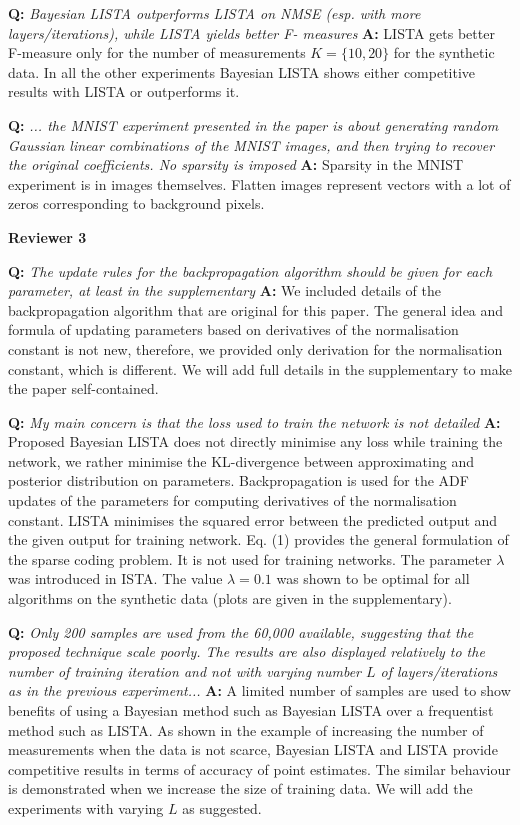 \documentclass{article}
\begin{document}
\textbf{Q:} \textit{Bayesian LISTA outperforms LISTA on NMSE (esp. with more layers/iterations), while LISTA yields better F- measures}
\textbf{A:} LISTA gets better F-measure only for the number of measurements $K = \{10, 20\}$ for the synthetic data. In all the other experiments Bayesian LISTA shows either competitive results with LISTA or outperforms it.

\textbf{Q:} \textit{... the MNIST experiment presented in the paper is about generating random Gaussian linear combinations of the MNIST images, and then trying to recover the original coefficients. No sparsity is imposed}
\textbf{A:} Sparsity in the MNIST experiment is in images themselves. Flatten images represent vectors with a lot of zeros corresponding to background pixels.

\textbf{Reviewer 3}

\textbf{Q:} \textit{The update rules for the backpropagation algorithm should be given for each parameter, at least in the supplementary}
\textbf{A:} We included details of the backpropagation algorithm that are original for this paper. The general idea and formula of updating parameters based on derivatives of the normalisation constant is not new, therefore, we provided only derivation for the normalisation constant, which is different. We will add full details in the supplementary to make the paper self-contained.

\textbf{Q:} \textit{My main concern is that the loss used to train the network is not detailed}
\textbf{A:} Proposed Bayesian LISTA does not directly minimise any loss while training the network, we rather minimise the KL-divergence between approximating and posterior distribution on parameters. Backpropagation is used for the ADF updates of the parameters for computing derivatives of the normalisation constant. LISTA minimises the squared error between the predicted output and the given output for training network. Eq. (1) provides the general formulation of the sparse coding problem. It is not used for training networks. The parameter $\lambda$ was introduced in ISTA. The value $\lambda=0.1$ was shown to be optimal for all algorithms on the synthetic data (plots are given in the supplementary).

\textbf{Q:} \textit{Only 200 samples are used from the 60,000 available, suggesting that the proposed technique scale poorly. The results are also displayed relatively to the number of training iteration and not with varying number $L$ of layers/iterations as in the previous experiment...}
\textbf{A:} A limited number of samples are used to show benefits of using a Bayesian method such as Bayesian LISTA over a frequentist method such as LISTA. As shown in the example of increasing the number of measurements when the data is not scarce, Bayesian LISTA and LISTA provide competitive results in terms of accuracy of point estimates. The similar behaviour is demonstrated when we increase the size of training data. We will add the experiments with varying $L$ as suggested.
\end{document}
